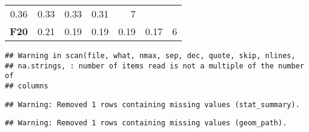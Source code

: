 \documentclass[12pt,a4paper]{article}
\begin{document}
\begin{longtable}[c]{@{}crrrrrr@{}}
\begin{minipage}[t]{0.08\columnwidth}
0.36
\strut\end{minipage} &
\begin{minipage}[t]{0.09\columnwidth}\raggedleft\strut
0.33
\strut\end{minipage} &
\begin{minipage}[t]{0.10\columnwidth}\raggedleft\strut
0.33
\strut\end{minipage} &
\begin{minipage}[t]{0.11\columnwidth}\raggedleft\strut
0.31
\strut\end{minipage} &
\begin{minipage}[t]{0.07\columnwidth}\raggedleft\strut
7
\strut\end{minipage}\tabularnewline
\begin{minipage}[t]{0.11\columnwidth}\centering\strut
\textbf{F20}
\strut\end{minipage} &
\begin{minipage}[t]{0.07\columnwidth}\raggedleft\strut
0.21
\strut\end{minipage} &
\begin{minipage}[t]{0.08\columnwidth}\raggedleft\strut
0.19
\strut\end{minipage} &
\begin{minipage}[t]{0.09\columnwidth}\raggedleft\strut
0.19
\strut\end{minipage} &
\begin{minipage}[t]{0.10\columnwidth}\raggedleft\strut
0.19
\strut\end{minipage} &
\begin{minipage}[t]{0.11\columnwidth}\raggedleft\strut
0.17
\strut\end{minipage} &
\begin{minipage}[t]{0.07\columnwidth}\raggedleft\strut
6
\strut\end{minipage}\tabularnewline
\bottomrule
\end{longtable}

\begin{verbatim}
## Warning in scan(file, what, nmax, sep, dec, quote, skip, nlines,
## na.strings, : number of items read is not a multiple of the number of
## columns
\end{verbatim}

\begin{verbatim}
## Warning: Removed 1 rows containing missing values (stat_summary).
\end{verbatim}

\begin{verbatim}
## Warning: Removed 1 rows containing missing values (geom_path).
\end{verbatim}
\end{document}
